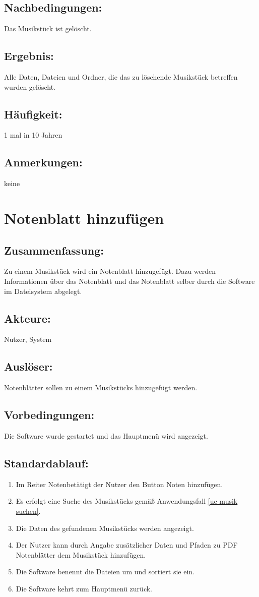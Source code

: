 \documentclass[a4paper,10pt]{scrartcl}
\begin{document}
\subsection{Nachbedingungen:}
Das Musikstück ist gelöscht.
\subsection{Ergebnis:}
Alle Daten, Dateien und Ordner, die das zu löschende Musikstück betreffen wurden gelöscht.
\subsection{Häufigkeit:}
1 mal in 10 Jahren
\subsection{Anmerkungen:}
keine
\newpage

\section{Notenblatt hinzufügen}
\label{uc noten hinzufuegen}
\subsection{Zusammenfassung:}
Zu einem Musikstück wird ein Notenblatt hinzugefügt. Dazu werden Informationen über das Notenblatt und das Notenblatt selber durch die Software im Dateisystem abgelegt.
\subsection{Akteure:}
Nutzer, System
\subsection{Auslöser:}
Notenblätter sollen zu einem Musikstücks hinzugefügt werden.
\subsection{Vorbedingungen:}
Die Software wurde gestartet und das Hauptmenü wird angezeigt.
\subsection{Standardablauf:}
\begin{enumerate}
	\item Im Reiter \glqq Noten\grqq betätigt der Nutzer den Button \glqq Noten hinzufügen\grqq.
	\item Es erfolgt eine Suche des Musikstücks gemäß Anwendungsfall \ref{uc musik suchen}.
	\item Die Daten des gefundenen Musikstücks werden angezeigt.
	\item Der Nutzer kann durch Angabe zusätzlicher Daten und Pfaden zu PDF Notenblätter dem Musikstück hinzufügen.
	\item Die Software benennt die Dateien um und sortiert sie ein.
	\item Die Software kehrt zum Hauptmenü zurück.
\end{enumerate}
\end{document}
